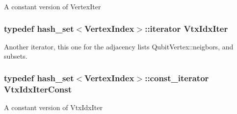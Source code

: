 A constant version of Vertex\-Iter 
\subsubsection{\setlength{\rightskip}{0pt plus 5cm}typedef hash\_\-set$<${\bf Vertex\-Index}$>$::iterator {\bf Vtx\-Idx\-Iter}}\label{graphsim_8h_a3}


Another iterator, this one for the adjacency lists Qubit\-Vertex::neigbors, and subsets. 
\subsubsection{\setlength{\rightskip}{0pt plus 5cm}typedef hash\_\-set$<${\bf Vertex\-Index}$>$::const\_\-iterator {\bf Vtx\-Idx\-Iter\-Const}}\label{graphsim_8h_a5}


A constant version of Vtx\-Idx\-Iter 
